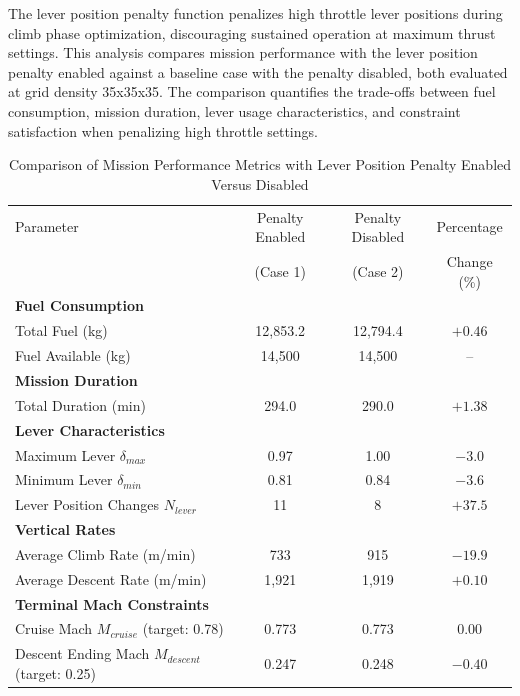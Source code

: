 The lever position penalty function penalizes high throttle lever positions during climb phase optimization, discouraging sustained operation at maximum thrust settings. This analysis compares mission performance with the lever position penalty enabled against a baseline case with the penalty disabled, both evaluated at grid density 35x35x35. The comparison quantifies the trade-offs between fuel consumption, mission duration, lever usage characteristics, and constraint satisfaction when penalizing high throttle settings.

\begin{table}[h]
    \centering
    \footnotesize
    \begin{tabular}{l c c c}
        \hline
        Parameter & Penalty Enabled & Penalty Disabled & Percentage \\
        & (Case 1) & (Case 2) & Change (\%) \\
        \hline
        \textbf{Fuel Consumption} & & & \\
        Total Fuel (kg) & 12{,}853.2 & 12{,}794.4 & $+0.46$ \\
        Fuel Available (kg) & 14{,}500 & 14{,}500 & -- \\
        \hline
        \textbf{Mission Duration} & & & \\
        Total Duration (min) & 294.0 & 290.0 & $+1.38$ \\
        \hline
        \textbf{Lever Characteristics} & & & \\
        Maximum Lever $\delta_{max}$ & 0.97 & 1.00 & $-3.0$ \\
        Minimum Lever $\delta_{min}$ & 0.81 & 0.84 & $-3.6$ \\
        Lever Position Changes $N_{lever}$ & 11 & 8 & $+37.5$ \\
        \hline
        \textbf{Vertical Rates} & & & \\
        Average Climb Rate (m/min) & 733 & 915 & $-19.9$ \\
        Average Descent Rate (m/min) & 1{,}921 & 1{,}919 & $+0.10$ \\
        \hline
        \textbf{Terminal Mach Constraints} & & & \\
        Cruise Mach $M_{cruise}$ (target: 0.78) & 0.773 & 0.773 & 0.00 \\
        Descent Ending Mach $M_{descent}$ (target: 0.25) & 0.247 & 0.248 & $-0.40$ \\
        \hline
    \end{tabular}
    \caption{Comparison of Mission Performance Metrics with Lever Position Penalty Enabled Versus Disabled}
    \label{tab:lever_penalty_comparison}
\end{table}

